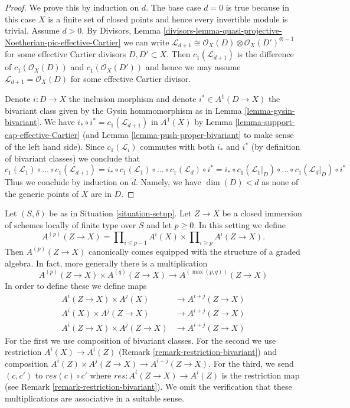 \begin{proof}
We prove this by induction on $d$. The base case $d = 0$ is true because
in this case $X$ is a finite set of closed points and hence every invertible
module is trivial. Assume $d > 0$. By Divisors, Lemma
\ref{divisors-lemma-quasi-projective-Noetherian-pic-effective-Cartier}
we can write $\mathcal{L}_{d + 1} \cong \mathcal{O}_X(D) \otimes
\mathcal{O}_X(D')^{\otimes -1}$ for some effective Cartier divisors
$D, D' \subset X$. Then $c_1(\mathcal{L}_{d + 1})$ is the difference
of $c_1(\mathcal{O}_X(D))$ and $c_1(\mathcal{O}_X(D'))$ and hence
we may assume $\mathcal{L}_{d + 1} = \mathcal{O}_X(D)$ for some
effective Cartier divisor.

\medskip\noindent
Denote $i : D \to X$ the inclusion morphism and denote
$i^* \in A^1(D \to X)$ the bivariant class given by the
Gysin hommomorphism as in Lemma \ref{lemma-gysin-bivariant}.
We have $i_* \circ i^* = c_1(\mathcal{L}_{d + 1})$
in $A^1(X)$ by Lemma \ref{lemma-support-cap-effective-Cartier}
(and Lemma \ref{lemma-push-proper-bivariant}
to make sense of the left hand side).
Since $c_1(\mathcal{L}_i)$ commutes with
both $i_*$ and $i^*$ (by definition of bivariant classes)
we conclude that
$$
c_1(\mathcal{L}_1) \circ \ldots \circ c_1(\mathcal{L}_{d + 1}) =
i_* \circ c_1(\mathcal{L}_1) \circ \ldots \circ c_1(\mathcal{L}_d) \circ i^* =
i_* \circ c_1(\mathcal{L}_1|_D) \circ \ldots \circ c_1(\mathcal{L}_d|_D)
\circ i^*
$$
Thus we conclude by induction on $d$. Namely, we have $\dim(D) < d$
as none of the generic points of $X$ are in $D$.
\end{proof}

\begin{remark}
\label{remark-ring-loc-classes}
Let $(S, \delta)$ be as in Situation \ref{situation-setup}.
Let $Z \to X$ be a closed immersion of schemes locally of
finite type over $S$ and let $p \geq 0$. In this setting we define
$$
A^{(p)}(Z \to X) =
\prod\nolimits_{i \leq p - 1} A^i(X) \times
\prod\nolimits_{i \geq p} A^i(Z \to X).
$$
Then $A^{(p)}(Z \to X)$ canonically comes equipped with the structure
of a graded algebra. In fact, more generally there is a multiplication
$$
A^{(p)}(Z \to X) \times A^{(q)}(Z \to X)
\longrightarrow A^{(\max(p, q))}(Z \to X)
$$
In order to define these we define maps
\begin{align*}
A^i(Z \to X) \times A^j(X) & \to A^{i + j}(Z \to X) \\
A^i(X) \times A^j(Z \to X) & \to A^{i + j}(Z \to X) \\
A^i(Z \to X) \times A^j(Z \to X) & \to A^{i + j}(Z \to X)
\end{align*}
For the first we use composition of bivariant classes.
For the second we use restriction
$A^i(X) \to A^i(Z)$ (Remark \ref{remark-restriction-bivariant}) and
composition $A^i(Z) \times A^j(Z \to X) \to A^{i + j}(Z \to X)$.
For the third, we send $(c, c')$ to $res(c) \circ c'$
where $res : A^i(Z \to X) \to A^i(Z)$ is the restriction map (see
Remark \ref{remark-restriction-bivariant}). We omit the
verification that these multiplications are associative in a suitable sense.
\end{remark}

